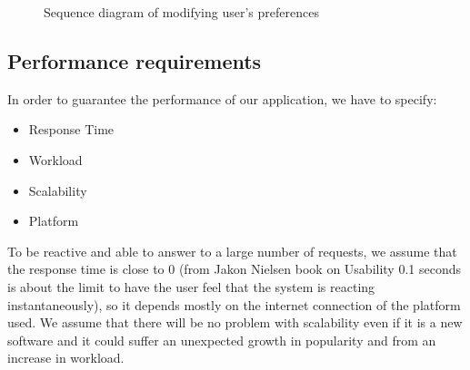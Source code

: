 \documentclass[12pt,titlepage]{article}
\begin{document}
\begin{figure}
\centering
{}
\caption{Sequence diagram of modifying user's preferences}
\end{figure}


\clearpage
\newpage

\subsection{Performance requirements}\label{sec:mod1}
In order to guarantee the performance of our application, we have to specify:
\begin{itemize}
\item Response Time 
\item Workload
\item Scalability
\item Platform
\end{itemize}
To be reactive and able to answer to a large number of requests, we assume that the response time is close to 0 (from Jakon Nielsen book on Usability 0.1 seconds is about the limit to have the user feel that the system is reacting instantaneously), so it depends mostly on the internet connection of the platform used. 
We assume that there will be no problem with scalability even if it is a new software and it could suffer an unexpected growth in popularity and from an increase in workload.
\end{document}

